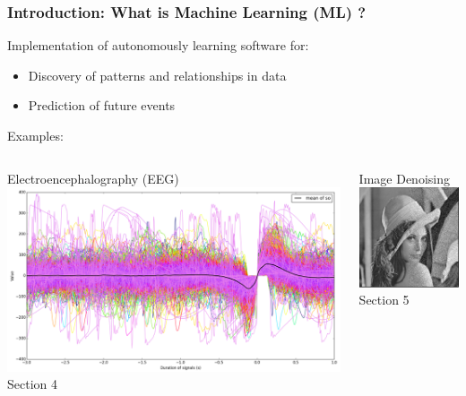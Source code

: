 \documentclass[10pt]{beamer}
\begin{document}
  \begin{frame}[t]\frametitle{Introduction: What is Machine Learning (ML) ?}
	  	Implementation of autonomously learning software for:
        \begin{itemize}
        	\item Discovery of patterns and relationships in data
        	\item Prediction of future events
        \end{itemize}
        \vspace{5pt}
        \alert{Examples:}
        \begin{columns}\hspace{5pt}
        	\begin{column}{.5\linewidth}
        		Electroencephalography (EEG)\\
        		\vspace{5pt}
        		\includegraphics[width = 0.8\linewidth]{EEG_oscillation.png}\\
        		\vspace{5pt}
        		\alert{Section 4}
        	\end{column}
        	\begin{column}{.5\linewidth}
        		Image Denoising\\
        		\vspace{5pt}
        		\includegraphics[width = 0.6\linewidth]{lena_pic.jpg}\\
        		\vspace{5pt}
        		\alert{Section 5}
        	\end{column}
        \end{columns}
  \end{frame}
\end{document}
